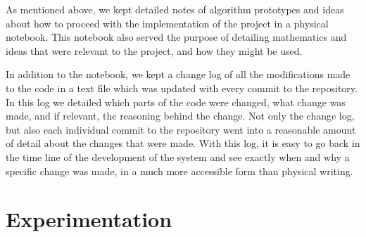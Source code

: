 \documentclass[a4paper,11pt]{article}
\begin{document}
   As mentioned above, we kept detailed notes of algorithm prototypes and ideas
   about how to proceed with the implementation of the project in a physical
   notebook. This notebook also served the purpose of detailing mathematics and
   ideas that were relevant to the project, and how they might be used. 

   In addition to the notebook, we kept a change log of all the modifications
   made to the code in a text file which was updated with every commit to the
   repository. In this log we detailed which parts of the code were changed,
   what change was made, and if relevant, the reasoning behind the change. Not
   only the change log, but also each individual commit to the repository went
   into a reasonable amount of detail about the changes that were made. With
   this log, it is easy to go back in the time line of the development of the
   system and see exactly when and why a specific change was made, in a much
   more accessible form than physical writing. 
\section{Experimentation}
\label{sec-8}
\end{document}
